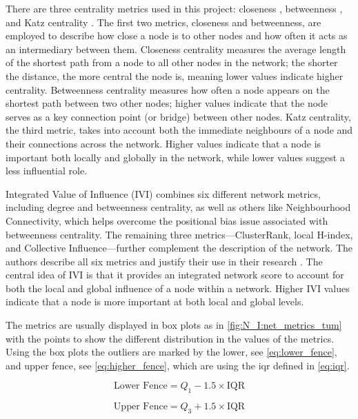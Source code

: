 There are three centrality metrics used in this project: closeness \citep{Opsahl2010-ok}, betweenness \citep{Freeman1977-qe}, and Katz centrality \citep{Katz1953-ie}. The first two metrics, closeness and betweenness, are employed to describe how close a node is to other nodes and how often it acts as an intermediary between them. Closeness centrality measures the average length of the shortest path from a node to all other nodes in the network; the shorter the distance, the more central the node is, meaning lower values indicate higher centrality. Betweenness centrality measures how often a node appears on the shortest path between two other nodes; higher values indicate that the node serves as a key connection point (or bridge) between other nodes. Katz centrality, the third metric, takes into account both the immediate neighbours of a node and their connections across the network. Higher values indicate that a node is important both locally and globally in the network, while lower values suggest a less influential role.

 
Integrated Value of Influence (IVI) \citep{Salavaty2020-wo} combines six different network metrics, including degree and betweenness centrality, as well as others like Neighbourhood Connectivity, which helps overcome the positional bias issue associated with betweenness centrality. The remaining three metrics—ClusterRank, local H-index, and Collective Influence—further complement the description of the network. The authors describe all six metrics and justify their use in their research \citet{Salavaty2020-wo}. The central idea of IVI is that it provides an integrated network score to account for both the local and global influence of a node within a network. Higher IVI values indicate that a node is more important at both local and global levels.


The metrics are usually displayed in box plots as in \cref{fig:N_I:net_metrics_tum} with the points to show the different distribution in the values of the metrics. Using the box plots the outliers are marked by the lower, see \cref{eq:lower_fence},  and upper fence, see \cref{eq:higher_fence}, which are using the \acrfull{iqr} defined in \cref{eq:iqr}.

\begin{equation} \label{eq:lower_fence}
  \text{Lower Fence} = Q_1 - 1.5 \times \text{IQR}
\end{equation}

\begin{equation} \label{eq:higher_fence}
  \text{Upper Fence} = Q_3 + 1.5 \times \text{IQR}
\end{equation}

